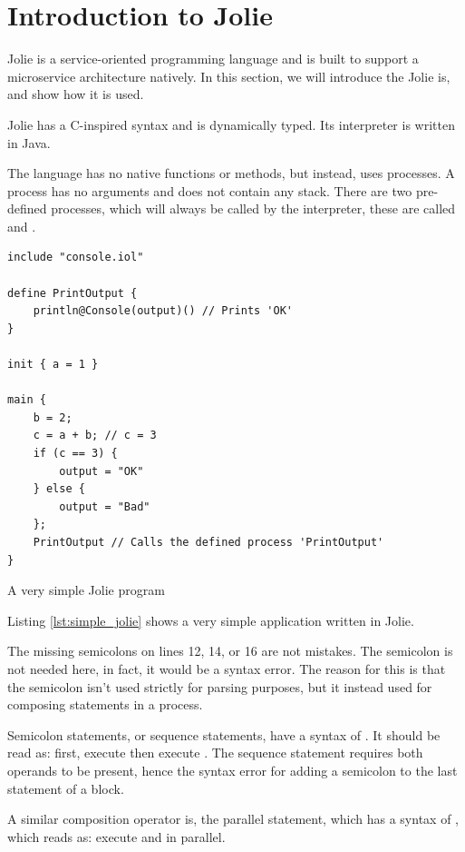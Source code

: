 \section{Introduction to Jolie}

Jolie is a service-oriented programming language and is built to support a
microservice architecture natively. In this section, we will introduce the
Jolie is, and show how it is used.

Jolie has a C-inspired syntax and is dynamically typed. Its interpreter is
written in Java.

The language has no native functions or methods, but instead, uses processes. A
process has no arguments and does not contain any stack. There are two
pre-defined processes, which will always be called by the interpreter, these
are called  and .

\begin{listing}[H]
\begin{verbatim}
include "console.iol"

define PrintOutput {
    println@Console(output)() // Prints 'OK'
}

init { a = 1 }

main {
    b = 2;
    c = a + b; // c = 3
    if (c == 3) {
        output = "OK"
    } else {
        output = "Bad"
    };
    PrintOutput // Calls the defined process 'PrintOutput'
}
\end{verbatim}
\caption{A very simple Jolie program}
\label{lst:simple_jolie}
\end{listing}

Listing \ref{lst:simple_jolie} shows a very simple application written in
Jolie.

The missing semicolons on lines 12, 14, or 16 are not mistakes. The semicolon
is not needed here, in fact, it would be a syntax error. The reason for this is
that the semicolon isn't used strictly for parsing purposes, but it instead
used for composing statements in a process.

Semicolon statements, or sequence statements, have a syntax of .
It should be read as: first, execute  then execute . The
sequence statement requires both operands to be present, hence the syntax error
for adding a semicolon to the last statement of a block.

A similar composition operator is, the parallel statement, which has a syntax
of , which reads as: execute  and  in
parallel.

